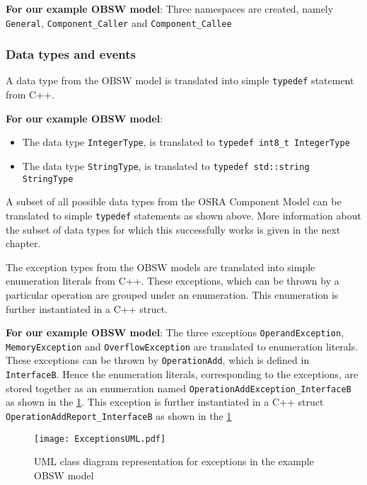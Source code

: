 \textbf{For our example OBSW model}: Three namespaces are created, namely \texttt{General}, \texttt{Component\_Caller} and \texttt{Component\_Callee} 

\subsubsection{\textbf{Data types and events}}
A data type from the OBSW model is translated into simple \texttt{typedef} statement from C++.

\textbf{For our example OBSW model}:
\begin{itemize}
\item The data type \texttt{IntegerType}, is translated to \texttt{typedef\allowbreak \ int8\_t IntegerType}
\item The data type \texttt{StringType}, is translated to \texttt{typedef\allowbreak \ std::string StringType} 
\end{itemize}

A subset of all possible data types from the OSRA Component Model can be translated to simple \texttt{typedef} statements as shown above. More information about the subset of data types for which this successfully works is given in the next chapter. 

The exception types from the OBSW models are translated into simple enumeration literals from C++. These exceptions, which can be thrown by a particular operation are grouped under an enumeration. This enumeration is further instantiated in a C++ struct.

\textbf{For our example OBSW model}: The three exceptions \texttt{Operand\allowbreak Exception}, \texttt{Memory\allowbreak Exception} and \texttt{Overflow\allowbreak Exception} are translated to enumeration literals. These exceptions can be thrown by \texttt{OperationAdd}, which is defined in \texttt{InterfaceB}. Hence the enumeration literals, corresponding to the exceptions, are stored together as an enumeration named \texttt{OperationAdd\allowbreak Exception\allowbreak\_InterfaceB} as shown in the \cref{fig: ExceptionsUML}. This exception is further instantiated in a C++ struct \texttt{OperationAdd\allowbreak Report\allowbreak\_InterfaceB} as shown in the \cref{fig: ExceptionsUML} 

\begin{figure}[h]
	\centering
	\texttt{[image: ExceptionsUML.pdf]}
	\caption{UML class diagram representation for exceptions in the example OBSW model}
	\label{fig: ExceptionsUML}
\end{figure}

